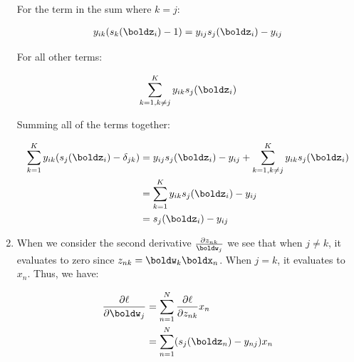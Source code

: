 \documentclass[submit]{harvardml}
\begin{document}
\begin{enumerate}
For the term in the sum where $k=j$:

\begin{align*}
    y_{ik}(s_k(\boldz_i) - 1) = y_{ij}s_j(\boldz_i) - y_{ij} 
\end{align*}

For all other terms:

\begin{align*}
    \sum^K_{k=1, k \neq j} y_{ik}s_j(\boldz_i)
\end{align*}

Summing all of the terms together:

\begin{align*}
    \sum_{k=1}^K y_{ik} (s_j(\boldz_i) - \delta_{jk}) &= y_{ij}s_j(\boldz_i) - y_{ij} + \sum^K_{k=1, k \neq j} y_{ik}s_j(\boldz_i)\\
    &= \sum^K_{k=1} y_{ik}s_j(\boldz_i) - y_{ij}\\
    &= s_j(\boldz_i) - y_{ij}
\end{align*}

\item 
When we consider the second derivative $\frac{\partial z_{nk}}{\boldw_j}$ we see that when $j \neq k$, it evaluates to zero since $z_{nk} = \boldw_k \boldx_n$. When $j = k$, it evaluates to $x_n$. Thus, we have:

\begin{align*}
    \frac{\partial \ell}{\partial \boldw_j} &= \sum_{n=1}^N \frac{\partial \ell}{\partial z_{nk}} x_n\\
    &= \sum_{n=1}^N (s_j(\boldz_n) - y_{nj})x_n
\end{align*}

\end{enumerate}
\end{document}
